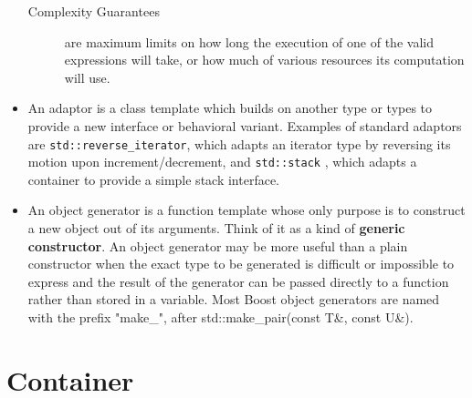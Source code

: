 \documentclass[a4paper,11pt,twoside]{book}
\begin{document}
\begin{itemize}
\begin{description}
	\item[Complexity Guarantees] are maximum limits on how long the execution of one of the valid expressions will take, or how much of various resources its computation will use.
\end{description}

\item An adaptor is a class template which builds on another type or types to provide a new interface or behavioral variant. Examples of standard adaptors are \texttt{std::reverse\_iterator}, which adapts an iterator type by reversing its motion upon increment/decrement, and \texttt{std::stack} , which adapts a container to provide a simple stack interface.
	
\item An object generator is a function template whose only purpose is to construct a new object out of its arguments. Think of it as a kind of \textbf{generic constructor}. An object generator may be more useful than a plain constructor when the exact type to be generated is difficult or impossible to express and the result of the generator can be passed directly to a function rather than stored in a variable. Most Boost object generators are named with the prefix "make\_", after std::make\_pair(const T\&, const U\&).
	
\end{itemize}


\section{Container}
\end{document}
